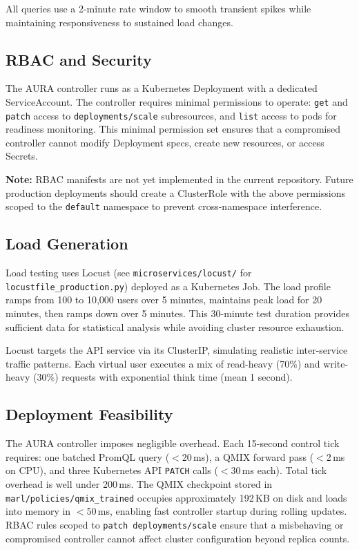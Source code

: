 \documentclass[conference]{IEEEtran}
\begin{document}
All queries use a 2-minute rate window to smooth transient spikes while
maintaining responsiveness to sustained load changes.

\subsection{RBAC and Security}

The AURA controller runs as a Kubernetes Deployment with a dedicated
ServiceAccount. The controller requires minimal permissions to operate:
\texttt{get} and \texttt{patch} access to \texttt{deployments/scale}
subresources, and \texttt{list} access to pods for readiness monitoring.
This minimal permission set ensures that a compromised controller cannot
modify Deployment specs, create new resources, or access Secrets.

\textbf{Note:} RBAC manifests are not yet implemented in the current
repository. Future production deployments should create a ClusterRole
with the above permissions scoped to the \texttt{default} namespace
to prevent cross-namespace interference.

\subsection{Load Generation}

Load testing uses Locust (see \texttt{microservices/locust/} for
\texttt{locustfile\_production.py}) deployed as a Kubernetes Job.
The load profile ramps from 100 to 10,000 users over 5 minutes,
maintains peak load for 20 minutes, then ramps down over 5 minutes.
This 30-minute test duration provides sufficient data for statistical
analysis while avoiding cluster resource exhaustion.

Locust targets the API service via its ClusterIP, simulating realistic
inter-service traffic patterns. Each virtual user executes a mix of
read-heavy (70\%) and write-heavy (30\%) requests with exponential
think time (mean 1 second).


\subsection{Deployment Feasibility}

The AURA controller imposes negligible overhead. Each 15-second
control tick requires: one batched PromQL query ($<$20\,ms),
a QMIX forward pass ($<$2\,ms on CPU), and three Kubernetes API
\texttt{PATCH} calls ($<$30\,ms each). Total tick overhead is well
under 200\,ms. The QMIX checkpoint stored in
\texttt{marl/policies/qmix\_trained} occupies approximately 192\,KB
on disk and loads into memory in $<$50\,ms, enabling fast controller
startup during rolling updates. RBAC rules scoped to
\texttt{patch deployments/scale} ensure that a misbehaving or
compromised controller cannot affect cluster configuration beyond
replica counts.
\end{document}

